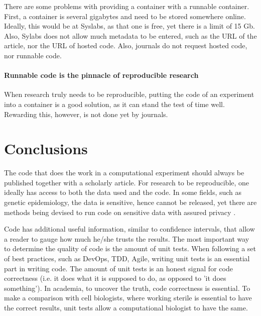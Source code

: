 There are some problems with providing a container with a runnable container.
First, a container is several gigabytes and need to be stored somewhere
online. Ideally, this would be at Syslabs, as that one is free, yet
there is a limit of 15 Gb. Also, Sylabs does not allow much metadata to
be entered, such as the URL of the article, nor the URL of hosted code.
Also, journals do not request hosted code, nor runnable code.

\paragraph{Runnable code is the pinnacle of reproducible research}

When research truly needs to be reproducible, putting the code 
of an experiment into a container is a good solution, as it 
can stand the test of time well. Rewarding this, however, is not
done yet by journals.

\section{Conclusions}

The code that does the work in a computational experiment should
always be published together with a scholarly article.
For research to be reproducible, one ideally has access to
both the data used and the code.
In some fields, such as genetic epidemiology, the data is
sensitive, hence cannot be released,
yet there are methods being devised to run code on sensitive
data with assured privacy \cite{zhang2016review,azencott2018machine}.

Code has additional useful information, similar to confidence intervals,
that allow a reader to gauge how much he/she trusts the results.
The most important way to determine the quality of code
is the amount of unit tests.
When following a set of best practices, such as DevOps, TDD, Agile,
writing unit tests is an essential 
part in writing code.
The amount of unit tests is an honest signal 
for code correctness (i.e. it does what it is supposed to do, as opposed
to 'it does something').
In academia, to uncover the truth, code correctness is essential.
To make a comparison with cell biologists, where working
sterile is essential to have the correct results,
unit tests allow a computational biologist to have the same.

